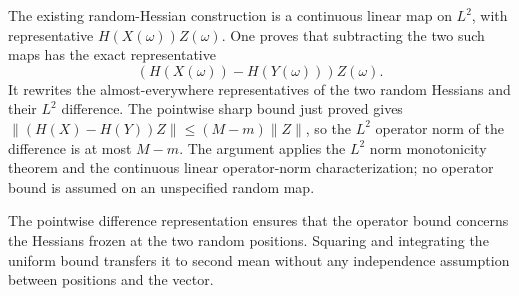 \documentclass[11pt,a4paper]{article}
\begin{document}
The existing random-Hessian construction is a continuous linear map on \(L^{2}\), with representative \(H(X(\omega))Z(\omega)\). One proves that subtracting the two such maps has the exact representative \[(H(X(\omega))-H(Y(\omega)))Z(\omega).\] It rewrites the almost-everywhere representatives of the two random Hessians and their \(L^{2}\) difference. The pointwise sharp bound just proved gives \(\|(H(X)-H(Y))Z\|\le(M-m)\|Z\|\), so the \(L^{2}\) operator norm of the difference is at most \(M-m\). The argument applies the \(L^{2}\) norm monotonicity theorem and the continuous linear operator-norm characterization; no operator bound is assumed on an unspecified random map.



The pointwise difference representation ensures that the operator bound concerns the Hessians frozen at the two random positions. Squaring and integrating the uniform bound transfers it to second mean without any independence assumption between positions and the vector.
\end{document}

